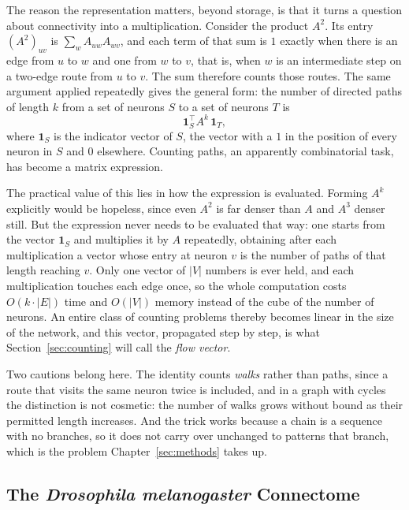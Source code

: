 \documentclass[12pt,a4paper,oneside]{article}
\theoremstyle{definition}
\theoremstyle{plain}
\newcommand{\Drosophila}{\textit{Drosophila melanogaster}}
\begin{document}
The reason the representation matters, beyond storage, is that it turns a
question about connectivity into a multiplication. Consider the product
$A^2$. Its entry $(A^2)_{uv}$ is $\sum_w A_{uw} A_{wv}$, and each term of
that sum is $1$ exactly when there is an edge from $u$ to $w$ and one from
$w$ to $v$, that is, when $w$ is an intermediate step on a two-edge route
from $u$ to $v$. The sum therefore counts those routes. The same argument
applied repeatedly gives the general form: the number of directed paths of
length $k$ from a set of neurons $S$ to a set of neurons $T$ is
\begin{equation}
  \label{eq:path-count}
  \mathbf{1}_S^{\top} A^k \, \mathbf{1}_T ,
\end{equation}
where $\mathbf{1}_S$ is the indicator vector of $S$, the vector with a $1$
in the position of every neuron in $S$ and $0$ elsewhere. Counting paths, an
apparently combinatorial task, has become a matrix expression.

The practical value of this lies in how the expression is evaluated. Forming
$A^k$ explicitly would be hopeless, since even $A^2$ is far denser than $A$
and $A^3$ denser still. But the expression never needs to be evaluated that
way: one starts from the vector $\mathbf{1}_S$ and multiplies it by $A$
repeatedly, obtaining after each multiplication a vector whose entry at
neuron $v$ is the number of paths of that length reaching $v$. Only one
vector of $|V|$ numbers is ever held, and each multiplication touches each
edge once, so the whole computation costs $O(k \cdot |E|)$ time and
$O(|V|)$ memory instead of the cube of the number of neurons. An entire
class of counting problems thereby becomes linear in the size of the
network, and this vector, propagated step by step, is what
Section~\ref{sec:counting} will call the \emph{flow vector}.

Two cautions belong here. The identity counts \emph{walks} rather than
paths, since a route that visits the same neuron twice is included, and in a
graph with cycles the distinction is not cosmetic: the number of walks grows
without bound as their permitted length increases. And the trick works
because a chain is a sequence with no branches, so it does not carry over
unchanged to patterns that branch, which is the problem
Chapter~\ref{sec:methods} takes up.

\subsection{The \Drosophila{} Connectome}
\label{sec:connectome}
\end{document}

